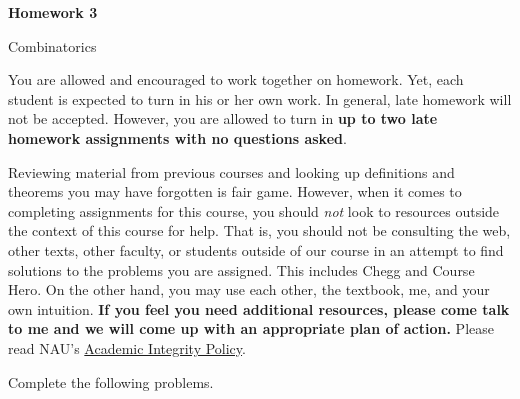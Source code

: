 \documentclass[11pt]{article}%
\theoremstyle{definition}
\newcommand{\blankline}{\pagebreak[2]\vspace{.5\baselineskip}}
\begin{document}
\begin{center}
{\Large\bf Homework 3}

\smallskip

Combinatorics
\end{center}

\thispagestyle{fancy}

You are allowed and encouraged to work together on homework. Yet, each student is expected to turn in his or her own work. In general, late homework will not be accepted. However, you are allowed to turn in \textbf{up to two late homework assignments with no questions asked}. 

\blankline

Reviewing material from previous courses and looking up definitions and theorems you may have forgotten is fair game. However, when it comes to completing assignments for this course, you should \emph{not} look to resources outside the context of this course for help.  That is, you should not be consulting the web, other texts, other faculty, or students outside of our course in an attempt to find solutions to the problems you are assigned.  This includes Chegg and Course Hero. On the other hand, you may use each other, the textbook, me, and your own intuition. \textbf{If you feel you need additional resources, please come talk to me and we will come up with an appropriate plan of action.} Please read NAU's \href{https://www5.nau.edu/policies/Client/Details/828?whoIsLooking=Students&pertainsTo=All&sortDirection=Ascending&page=1}{Academic Integrity Policy}.

\blankline

Complete the following problems. 
\end{document}
